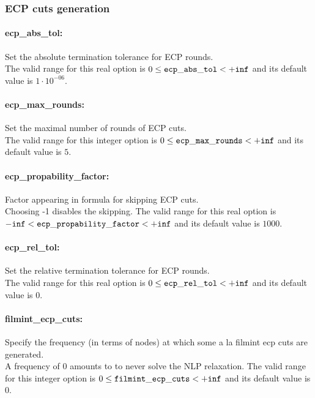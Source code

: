 \subsubsection{ECP cuts generation}
\label{sec:ECP_cuts_generation}

\paragraph{ecp\_abs\_tol:}\label{sec:ecp_abs_tol} Set the absolute termination tolerance for ECP rounds. $\;$ \\
 The valid range for this real option is 
$0 \le {\tt ecp\_abs\_tol } <  {\tt +inf}$
and its default value is $1 \cdot 10^{-06}$.


\paragraph{ecp\_max\_rounds:}\label{sec:ecp_max_rounds} Set the maximal number of rounds of ECP cuts. $\;$ \\
 The valid range for this integer option is
$0 \le {\tt ecp\_max\_rounds } <  {\tt +inf}$
and its default value is $5$.


\paragraph{ecp\_propability\_factor:}\label{sec:ecp_propability_factor} Factor appearing in formula for skipping ECP cuts. $\;$ \\
 Choosing -1 disables the skipping. The valid range for this real option is 
${\tt -inf} <  {\tt ecp\_propability\_factor } <  {\tt +inf}$
and its default value is $1000$.


\paragraph{ecp\_rel\_tol:}\label{sec:ecp_rel_tol} Set the relative termination tolerance for ECP rounds. $\;$ \\
 The valid range for this real option is 
$0 \le {\tt ecp\_rel\_tol } <  {\tt +inf}$
and its default value is $0$.


\paragraph{filmint\_ecp\_cuts:}\label{sec:filmint_ecp_cuts} Specify the frequency (in terms of nodes) at which some a la filmint ecp cuts are generated. $\;$ \\
 A frequency of 0 amounts to to never solve the
NLP relaxation. The valid range for this integer option is
$0 \le {\tt filmint\_ecp\_cuts } <  {\tt +inf}$
and its default value is $0$.


